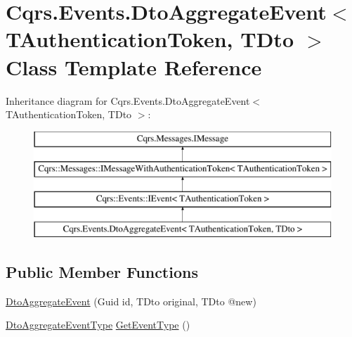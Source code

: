 \hypertarget{classCqrs_1_1Events_1_1DtoAggregateEvent}{}\section{Cqrs.\+Events.\+Dto\+Aggregate\+Event$<$ T\+Authentication\+Token, T\+Dto $>$ Class Template Reference}
\label{classCqrs_1_1Events_1_1DtoAggregateEvent}
Inheritance diagram for Cqrs.\+Events.\+Dto\+Aggregate\+Event$<$ T\+Authentication\+Token, T\+Dto $>$\+:\begin{figure}[H]
\begin{center}
\leavevmode
\includegraphics[height=4.000000cm]{classCqrs_1_1Events_1_1DtoAggregateEvent}
\end{center}
\end{figure}
\subsection*{Public Member Functions}
\begin{DoxyCompactItemize}
\item 
\hyperlink{classCqrs_1_1Events_1_1DtoAggregateEvent_a9741e3dae73892ee98408547ea953d4d}{Dto\+Aggregate\+Event} (Guid id, T\+Dto original, T\+Dto @new)
\item 
\hyperlink{namespaceCqrs_1_1Events_a2a32e13adeac92f5a93966cd8ee2d39a}{Dto\+Aggregate\+Event\+Type} \hyperlink{classCqrs_1_1Events_1_1DtoAggregateEvent_af5bed152d656cb758312f499f87e69de}{Get\+Event\+Type} ()
\end{DoxyCompactItemize}
